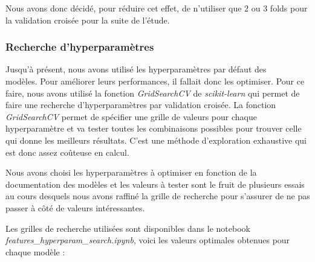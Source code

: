 \documentclass{article}
\begin{document}
Nous avons donc décidé, pour réduire cet effet, de n'utiliser que 2 ou 3 folds pour la
validation croisée pour la suite de l'étude.

\newpage
\subsubsection{Recherche d'hyperparamètres}
Jusqu'à présent, nous avons utilisé les hyperparamètres par défaut des \\modèles. Pour améliorer
leurs performances, il fallait donc les optimiser. Pour ce faire, nous avons utilisé la fonction
\textit{GridSearchCV} \cite{GSCV} de \textit{scikit-learn} qui permet de faire une recherche
d'hyperparamètres par validation croisée. La fonction \textit{GridSearchCV} permet de spécifier
une grille de valeurs pour chaque hyperparamètre et va tester toutes les combinaisons possibles
pour trouver celle qui donne les meilleurs résultats. C'est une méthode d'exploration exhaustive
qui est donc assez coûteuse en calcul.

Nous avons choisi les hyperparamètres à optimiser en fonction de la documentation des modèles
et les valeurs à tester sont le fruit de plusieurs essais au cours desquels nous avons
raffiné la grille de recherche pour s'assurer de ne pas passer à côté de valeurs intéressantes.

Les grilles de recherche utilisées sont disponibles dans le notebook \\
\textit{features\_hyperparam\_search.ipynb}, voici les valeurs optimales obtenues pour
chaque modèle :
\end{document}
